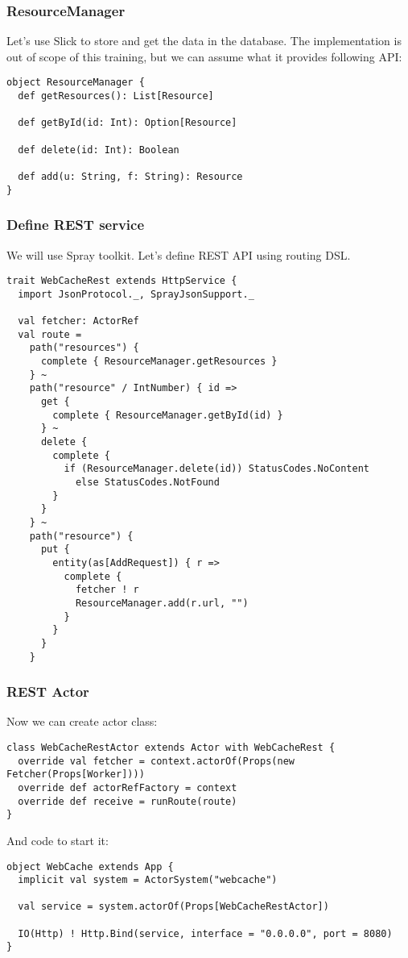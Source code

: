 \begin{frame}[fragile]
\frametitle{ResourceManager}
Let's use Slick to store and get the data in the database.  The implementation is out of
scope of this training, but we can assume what it provides following API:

\begin{lstlisting}
object ResourceManager {
  def getResources(): List[Resource]

  def getById(id: Int): Option[Resource]

  def delete(id: Int): Boolean

  def add(u: String, f: String): Resource
}
\end{lstlisting}
\end{frame}

\begin{frame}[fragile]
\frametitle{Define REST service}
We will use Spray toolkit.  Let's define REST API using routing DSL.

\begin{lstlisting}
trait WebCacheRest extends HttpService {
  import JsonProtocol._, SprayJsonSupport._

  val fetcher: ActorRef
  val route =
    path("resources") {
      complete { ResourceManager.getResources }
    } ~
    path("resource" / IntNumber) { id =>
      get {
        complete { ResourceManager.getById(id) }
      } ~
      delete {
        complete {
          if (ResourceManager.delete(id)) StatusCodes.NoContent
            else StatusCodes.NotFound
        }
      }
    } ~
    path("resource") {
      put {
        entity(as[AddRequest]) { r =>
          complete {
            fetcher ! r
            ResourceManager.add(r.url, "")
          }
        }
      }
    }
\end{lstlisting}
\end{frame}

\begin{frame}[fragile]
\frametitle{REST Actor}
Now we can create actor class:

\begin{lstlisting}
class WebCacheRestActor extends Actor with WebCacheRest {
  override val fetcher = context.actorOf(Props(new Fetcher(Props[Worker])))
  override def actorRefFactory = context
  override def receive = runRoute(route)
}
\end{lstlisting}

And code to start it:

\begin{lstlisting}
object WebCache extends App {
  implicit val system = ActorSystem("webcache")

  val service = system.actorOf(Props[WebCacheRestActor])

  IO(Http) ! Http.Bind(service, interface = "0.0.0.0", port = 8080)
}
\end{lstlisting}
\end{frame}

